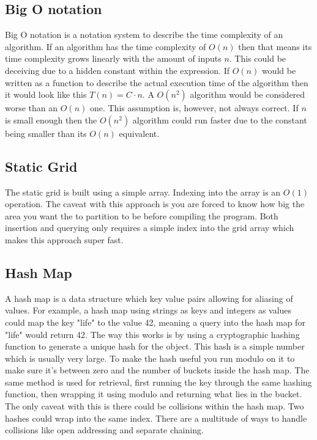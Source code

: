\documentclass[a4paper, 12pt]{article}
\begin{document}
\subsection{Big O notation}
Big O notation is a notation system to describe the time complexity of an
algorithm. If an algorithm has the time complexity of $O(n)$ then that means
its time complexity grows linearly with the amount of inputs $n$. This could be
deceiving due to a hidden constant within the expression. If $O(n)$ would be
written as a function to describe the actual execution time of the algorithm
then it would look like this $T(n) = C \cdot n$. A $O(n^{2})$ algorithm would
be considered worse than an $O(n)$ one. This assumption is, however, not always
correct. If $n$ is small enough then the $O(n^{2})$ algorithm could run faster
due to the constant being smaller than its $O(n)$ equivalent.

\subsection{Static Grid}
The static grid is built using a simple array. Indexing into the array is an
$O(1)$ operation. The caveat with this approach is you are forced to know how
big the area you want the to partition to be before compiling the program. Both
insertion and querying only requires a simple index into the grid array which
makes this approach super fast.

\subsection{Hash Map}
A hash map is a data structure which key value pairs allowing for aliasing of
values. For example, a hash map using strings as keys and integers as values
could map the key "life" to the value 42, meaning a query into the hash map for
"life" would return 42. The way this works is by using a cryptographic hashing
function to generate a unique hash for the object. This hash is a simple number
which is usually very large. To make the hash useful you run modulo on it to
make sure it's between zero and the number of buckets inside the hash map. The
same method is used for retrieval, first running the key through the same
hashing function, then wrapping it using modulo and returning what lies in the
bucket. The only caveat with this is there could be collisions within the hash
map. Two hashes could wrap into the same index. There are a multitude of ways to
handle collisions like open addressing and separate chaining.
\end{document}
